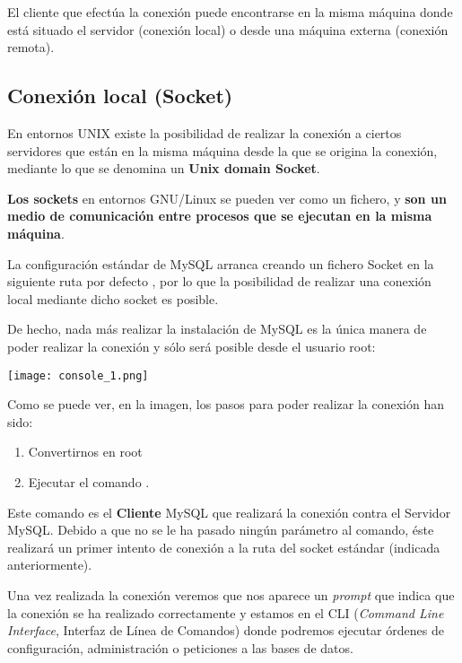 El cliente que efectúa la conexión puede encontrarse en la misma máquina donde está situado el servidor (conexión local) o desde una máquina externa (conexión remota).


\subsection{Conexión local (Socket)}
En entornos UNIX existe la posibilidad de realizar la conexión a ciertos servidores que están en la misma máquina desde la que se origina la conexión, mediante lo que se denomina un \textbf{Unix domain Socket}.

\textbf{Los sockets} en entornos GNU/Linux se pueden ver como un fichero, y \textbf{son un medio de comunicación entre procesos que se ejecutan en la misma máquina}.

La configuración estándar de MySQL arranca creando un fichero Socket en la siguiente ruta por defecto , por lo que la posibilidad de realizar una conexión local mediante dicho socket es posible.

De hecho, nada más realizar la instalación de MySQL es la única manera de poder realizar la conexión y sólo será posible desde el usuario root:

\begin{center}
    \vspace{-15pt}
    \texttt{[image: console\_1.png]}
    \vspace{-20pt}
\end{center}

Como se puede ver, en la imagen, los pasos para poder realizar la conexión han sido:
\begin{enumerate}
    \item Convertirnos en root
    \item Ejecutar el comando .
\end{enumerate}

Este comando es el \textbf{Cliente} MySQL que realizará la conexión contra el Servidor MySQL. Debido a que no se le ha pasado ningún parámetro al comando, éste realizará un primer intento de conexión a la ruta del socket estándar (indicada anteriormente).

Una vez realizada la conexión veremos que nos aparece un \textit{prompt}   que indica que la conexión se ha realizado correctamente y estamos en el CLI (\textit{Command Line Interface}, Interfaz de Línea de Comandos) donde podremos ejecutar órdenes de configuración, administración o peticiones a las bases de datos.

